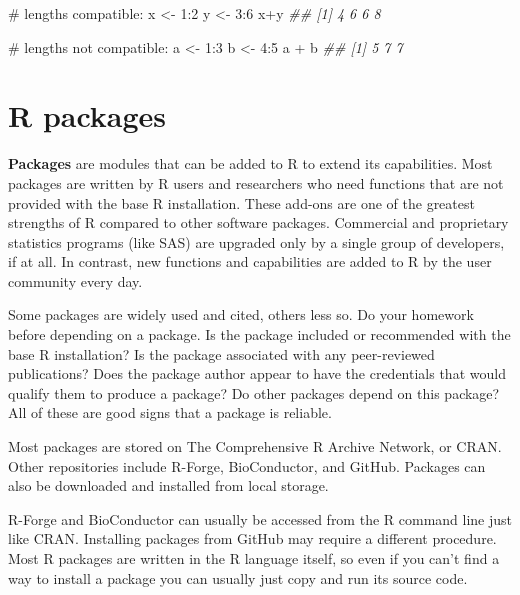\documentclass[
  13,
  letterpaper,
]{report}
\newenvironment{Shaded}{\begin{snugshade}}{\end{snugshade}}
\newcommand{\CommentTok}[1]{\textcolor[rgb]{0.37,0.37,0.37}{#1}}
\newcommand{\DecValTok}[1]{\textcolor[rgb]{0.68,0.00,0.00}{#1}}
\newcommand{\DocumentationTok}[1]{\textcolor[rgb]{0.37,0.37,0.37}{\textit{#1}}}
\newcommand{\NormalTok}[1]{\textcolor[rgb]{0.00,0.23,0.31}{#1}}
\newcommand{\OtherTok}[1]{\textcolor[rgb]{0.00,0.23,0.31}{#1}}
\newcommand{\SpecialCharTok}[1]{\textcolor[rgb]{0.37,0.37,0.37}{#1}}
\begin{document}
\begin{Shaded}
\begin{Highlighting}[]
\CommentTok{\# lengths compatible:}
\NormalTok{x }\OtherTok{\textless{}{-}} \DecValTok{1}\SpecialCharTok{:}\DecValTok{2}
\NormalTok{y }\OtherTok{\textless{}{-}} \DecValTok{3}\SpecialCharTok{:}\DecValTok{6}
\NormalTok{x}\SpecialCharTok{+}\NormalTok{y}
\DocumentationTok{\#\# [1] 4 6 6 8}

\CommentTok{\# lengths not compatible:}
\NormalTok{a }\OtherTok{\textless{}{-}} \DecValTok{1}\SpecialCharTok{:}\DecValTok{3}
\NormalTok{b }\OtherTok{\textless{}{-}} \DecValTok{4}\SpecialCharTok{:}\DecValTok{5}
\NormalTok{a }\SpecialCharTok{+}\NormalTok{ b}
\DocumentationTok{\#\# [1] 5 7 7}
\end{Highlighting}
\end{Shaded}

\section{R packages}\label{sec-r-pack}

\textbf{Packages} are modules that can be added to R to extend its
capabilities. Most packages are written by R users and researchers who
need functions that are not provided with the base R installation. These
add-ons are one of the greatest strengths of R compared to other
software packages. Commercial and proprietary statistics programs (like
SAS) are upgraded only by a single group of developers, if at all. In
contrast, new functions and capabilities are added to R by the user
community every day.

Some packages are widely used and cited, others less so. Do your
homework before depending on a package. Is the package included or
recommended with the base R installation? Is the package associated with
any peer-reviewed publications? Does the package author appear to have
the credentials that would qualify them to produce a package? Do other
packages depend on this package? All of these are good signs that a
package is reliable.

Most packages are stored on The Comprehensive R Archive Network, or
CRAN. Other repositories include R-Forge, BioConductor, and GitHub.
Packages can also be downloaded and installed from local storage.

R-Forge and BioConductor can usually be accessed from the R command line
just like CRAN. Installing packages from GitHub may require a different
procedure. Most R packages are written in the R language itself, so even
if you can't find a way to install a package you can usually just copy
and run its source code.
\end{document}
